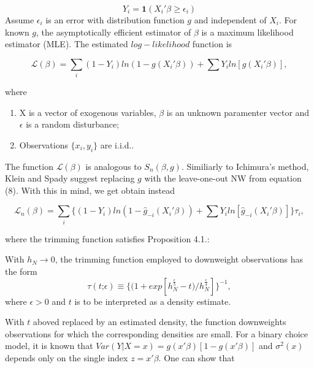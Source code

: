 \documentclass[a4paper]{article}
\begin{document}
\begin{equation}
Y_i =  \mathbf{1}{(X_i'\beta \geq \epsilon_i)}
\end{equation}
Assume $\epsilon_i$ is an error with distribution function $g$ and independent of $X_i$. For known $g$, the asymptotically efficient estimator of $\beta$ is a maximum likelihood estimator (MLE). The estimated $log-likelihood$ function is

\begin{equation}
\mathcal{L}(\beta) = \sum_i (1 - Y_i)ln( 1 - g(X_i'\beta)) + \sum Y_iln[g(X_i'\beta)],
\end{equation}

where

\begin{enumerate}
		\item X is a vector of exogenous variables, $\beta$ is an unknown paramenter vector and $\epsilon$ is a random disturbance;
		\item Observations $\{x_i,y_i\}$ are i.i.d..
\end{enumerate}

The function $\mathcal{L}(\beta)$ is analogous to $S_n(\beta,g)$. Similiarly to Ichimura's method, Klein and Spady suggest replacing $g$ with the leave-one-out NW from equation (8). With this in mind, we get obtain instead

\begin{equation}
\mathcal{L}_n(\beta) = \sum_i \{ (1 - Y_i)ln( 1 - \hat{g}_{-i}(X_i'\beta)) + \sum Y_iln[\hat{g}_{-i}(X_i'\beta)]\}\tau_{i},
\end{equation}

where the trimming function satisfies Proposition 4.1.:

\newtheorem{proposition}{Proposition}[section]
\begin{prop}
With $h_N \rightarrow 0$, the trimming function employed to downweight observations has the form
\[ \tau(t \text{;}\epsilon) \equiv \{(1 + exp[h_{N}^{\frac{\epsilon}{5}} - t)/h_{N}^{\frac{\epsilon}{4}}]\}^{-1}, \]
where $\epsilon > 0$ and $t$ is to be interpreted as a density estimate.
\end{prop}

With $t$ aboved replaced by an estimated density, the function downweights observations for which the corresponding densities are small.
For a binary choice model, it is known that $Var(Y|X = x) = g(x'\beta)[1 - g(x'\beta)]$ and $\sigma^2(x)$ depends only on the single index $z = x'\beta$. One can show that %
\end{document}
